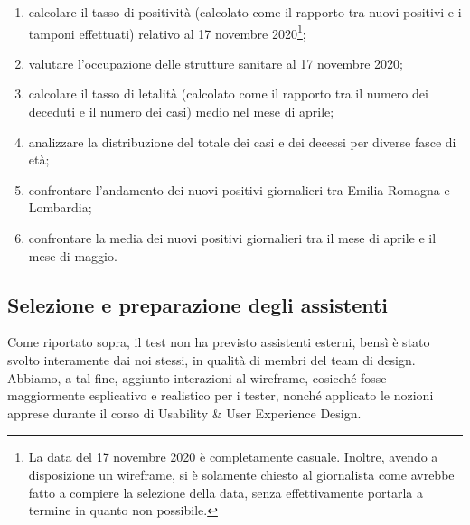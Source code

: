 \begin{enumerate}
    \item calcolare il tasso di positività (calcolato come il rapporto tra nuovi positivi e i tamponi effettuati) relativo al 17 novembre 2020\footnote{La data del 17 novembre 2020 è completamente casuale. Inoltre, avendo a disposizione un wireframe, si è solamente chiesto al giornalista come avrebbe fatto a compiere la selezione della data, senza effettivamente portarla a termine in quanto non possibile.};    
    \item valutare l'occupazione delle strutture sanitare al 17 novembre 2020;
    \item calcolare il tasso di letalità (calcolato come il rapporto tra il numero dei deceduti e il numero dei casi) medio nel mese di aprile;
    \item analizzare la distribuzione del totale dei casi e dei decessi per diverse fasce di età;
    \item confrontare l'andamento dei nuovi positivi giornalieri tra Emilia Romagna e Lombardia;
    \item confrontare la media dei nuovi positivi giornalieri tra il mese di aprile e il mese di maggio.
\end{enumerate}

\subsection{Selezione e preparazione degli assistenti}
\label{ss:vd-selezione-preparazione-assistenti}
Come riportato sopra, il test non ha previsto assistenti esterni, bensì è stato svolto interamente dai noi stessi, in qualità di membri del team di design.
Abbiamo, a tal fine, aggiunto interazioni al wireframe, cosicché fosse maggiormente esplicativo e realistico per i tester, nonché applicato le nozioni apprese durante il corso di Usability \& User Experience Design.

